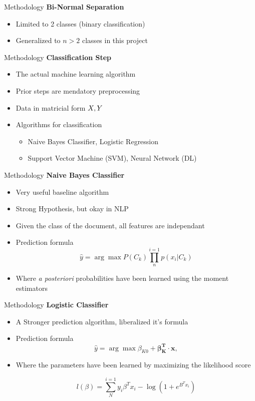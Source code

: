 \begin{frame}[label=metho]{Methodology}
	\textbf{Bi-Normal Separation}
	\begin{itemize}
		\item Limited to 2 classes (binary classification)
		\item Generalized to $n>2$ classes in this project
	\end{itemize}
\end{frame}


\begin{frame}[label=metho]{Methodology}
	\textbf{Classification Step}
	\begin{itemize}
		\item The actual machine learning algorithm
		\item Prior steps are mendatory preprocessing
		\item Data in matricial form $\boldmath{X}, \boldmath{Y}$ 
		\item Algorithms for classification
		\begin{itemize}
			\item Naive Bayes Classifier, Logistic Regression
			\item Support Vector Machine (SVM), Neural Network (DL)
		\end{itemize}
	\end{itemize}
\end{frame}


\begin{frame}[label=metho]{Methodology}
	\textbf{Naive Bayes Classifier}
	\begin{itemize}
		\item Very useful baseline algorithm
		\item Strong Hypothesis, but okay in NLP
		\item Given the class of the document, all features are independant
		\item Prediction formula
		$$\hat{y} = \arg\max P(C_k) \prod_{n}^{i=1}p(x_i|C_k)$$
		\item Where \textit{a posteriori} probabilities have been learned using the moment estimators
		
	\end{itemize}
	
	
	
\end{frame}




\begin{frame}[label=metho]{Methodology}
	\textbf{Logistic Classifier}
	\begin{itemize}
		\item A Stronger prediction algorithm, liberalized it's formula
		\item Prediction formula
$$ \hat{y} = \arg\max \beta_{K0} + \boldsymbol{\beta_{K}^T} \cdot  \boldsymbol{x} , $$
		\item Where the parameters have been learned by maximizing the likelihood score

	$$  l(\beta) = \sum_{N}^{i=1} y_i \beta^T x_i - \log(1+ e^{B^T x_i}) $$
		
	\end{itemize}
\end{frame}

